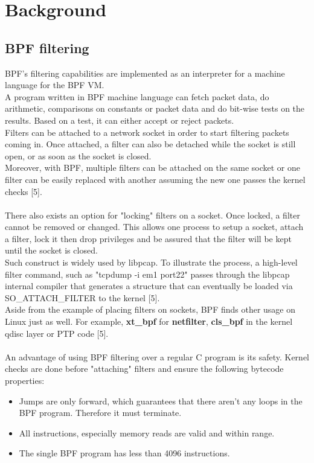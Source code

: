 \documentclass{l4proj}
\begin{document}
\chapter{Background}
\section{BPF filtering}
BPF's filtering capabilities are implemented as an interpreter for a machine language for the BPF VM.\\
A program written in BPF machine language can fetch packet data, do arithmetic, comparisons on constants or packet data and do bit-wise tests on the results. Based on a test, it can either accept or reject packets.\\
Filters can be attached to a network socket in order to start filtering packets coming in. Once attached, a filter can also be detached while the socket is still open, or as soon as the socket is closed.\\
Moreover, with BPF, multiple filters can be attached on the same socket or one filter can be easily replaced with another assuming the new one passes the kernel checks [5].\\\\
There also exists an option for "locking" filters on a socket. Once locked, a filter cannot be removed or changed. This allows one process to setup a socket, attach a filter, lock it then drop privileges and be assured that the filter will be kept until the socket is closed.\\
Such construct is widely used by libpcap. To illustrate the process, a high-level filter command, such as "tcpdump -i em1 port22" passes through the libpcap internal compiler that generates a structure that can eventually be loaded via SO\_ATTACH\_FILTER to the kernel [5].\\
Aside from the example of placing filters on sockets, BPF finds other usage on Linux just as well. For example, \textbf{xt\_bpf} for \textbf{netfilter}, \textbf{cls\_bpf} in the kernel qdisc layer or PTP code [5].\\\\
An advantage of using BPF filtering over a regular C program is its safety. Kernel checks are done before "attaching" filters and ensure the following bytecode properties:
\begin{itemize}
    \item Jumps are only forward, which guarantees that there aren't any loops in the BPF program. Therefore it must terminate.
    \item All instructions, especially memory reads are valid and within range.
    \item The single BPF program has less than 4096 instructions.
\end{itemize}
\end{document}
